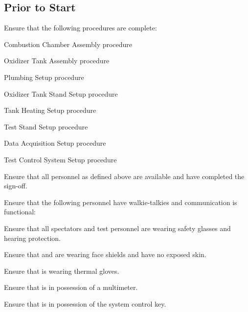 \subsection{Prior to Start}
\begin{checklist}
    \item Ensure that the following procedures are complete:
    \begin{checklist}
        \item Combustion Chamber Assembly procedure
        \item Oxidizer Tank Assembly procedure
        \item Plumbing Setup procedure
        \item Oxidizer Tank Stand Setup procedure
        \item Tank Heating Setup procedure
        \item Test Stand Setup procedure
        \item Data Acquisition Setup procedure
        \item Test Control System Setup procedure
    \end{checklist}
    \item Ensure that all personnel as defined above are available and have completed the sign-off.
    \item Ensure that the following personnel have walkie-talkies and communication is functional:
    \begin{checklist}
        \item \ops{}
        \item \secondary{}
        \item \daq{}
        \item \peri{}
        \item \perii{}
        \item \periii{}
    \end{checklist}
    \item Ensure that all spectators and test personnel are wearing safety glasses and hearing protection.
    \item Ensure that \primary{} and \secondary{} are wearing face shields and have no exposed skin.
    \item Ensure that \primary{} is wearing thermal gloves.
    \item Ensure that \secondary{} is in possession of a multimeter.
    \item Ensure that \ops{} is in possession of the system control key.
\end{checklist}
\setcounter{checklistnum}{0}

